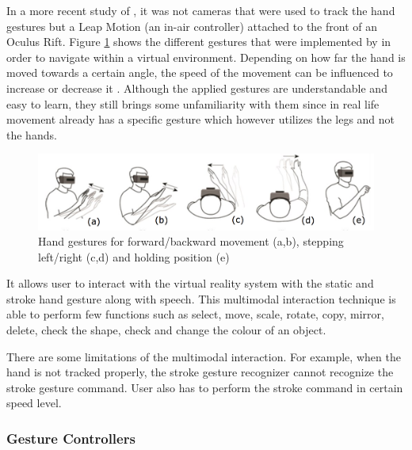 In a more recent study of \cite{Khundam2015}, it was not cameras that were used to track the hand gestures but a Leap Motion (an in-air controller) attached to the front of an Oculus Rift. Figure \ref{fig:leapmotion} shows the different gestures that were implemented by \cite{Khundam2015} in order to navigate within a virtual environment. Depending on how far the hand is moved towards a certain angle, the speed of the movement can be influenced to increase or decrease it \citep{Khundam2015}. Although the applied gestures are understandable and easy to learn, they still brings some unfamiliarity with them since in real life movement already has a specific gesture which however utilizes the legs and not the hands.
\begin{figure}[h]
	\begin{center}
		\includegraphics[width=14cm]{03_Figures/05_LitReview/Khundam2015_LeapMotion.png}
		\caption[Hand gestures for forward/backward movement, stepping left/right and holding position]{Hand gestures for forward/backward movement (a,b), stepping left/right (c,d) and holding position (e) \citep{Khundam2015}}
		\label{fig:leapmotion}
	\end{center}
\end{figure}
\newline


It allows user to interact with the virtual reality system with the static and stroke hand gesture along with speech. This multimodal interaction technique is able to perform few functions such as select, move, scale, rotate, copy, mirror, delete, check the shape, check and change the colour of an object.
\cite{Chun2015}

There are some limitations of the multimodal interaction. For example, when the hand is not tracked properly, the stroke gesture recognizer cannot recognize the stroke gesture command. User also has to perform the stroke command in certain speed level.
\cite{Chun2015}


\subsubsection{Gesture Controllers}

